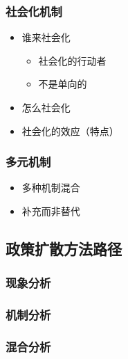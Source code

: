 \documentclass[
  12pt,
]{ctexart}
\begin{document}
\hypertarget{ux793eux4f1aux5316ux673aux5236}{%
\subsubsection{社会化机制}\label{ux793eux4f1aux5316ux673aux5236}}

\begin{itemize}
\item
  谁来社会化

  \begin{itemize}
  \item
    社会化的行动者
  \item
    不是单向的
  \end{itemize}
\item
  怎么社会化
\item
  社会化的效应（特点）
\end{itemize}

\hypertarget{ux591aux5143ux673aux5236}{%
\subsubsection{多元机制}\label{ux591aux5143ux673aux5236}}

\begin{itemize}
\item
  多种机制混合
\item
  补充而非替代
\end{itemize}

\hypertarget{ux653fux7b56ux6269ux6563ux65b9ux6cd5ux8defux5f84}{%
\subsection{政策扩散方法路径}\label{ux653fux7b56ux6269ux6563ux65b9ux6cd5ux8defux5f84}}

\hypertarget{ux73b0ux8c61ux5206ux6790}{%
\subsubsection{现象分析}\label{ux73b0ux8c61ux5206ux6790}}

\hypertarget{ux673aux5236ux5206ux6790}{%
\subsubsection{机制分析}\label{ux673aux5236ux5206ux6790}}

\hypertarget{ux6df7ux5408ux5206ux6790}{%
\subsubsection{混合分析}\label{ux6df7ux5408ux5206ux6790}}
\end{document}

